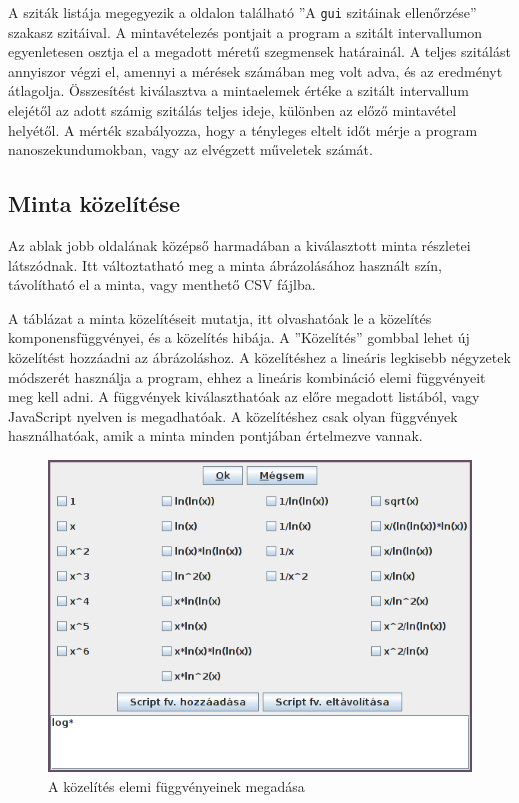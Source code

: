 A sziták listája megegyezik a \pageref{sec:szitak-ellenorzese} oldalon található ''A \texttt{gui} szitáinak ellenőrzése'' szakasz szitáival.
A mintavételezés pontjait a program a szitált intervallumon egyenletesen osztja el a megadott méretű szegmensek határainál.
A teljes szitálást annyiszor végzi el, amennyi a mérések számában meg volt adva, és az eredményt átlagolja.
Összesítést kiválasztva a mintaelemek értéke a szitált intervallum elejétől az adott számig szitálás teljes ideje, különben az előző mintavétel helyétől.
A mérték szabályozza, hogy a tényleges eltelt időt mérje a program nanoszekundumokban, vagy az elvégzett műveletek számát.

\subsection{Minta közelítése}

Az ablak jobb oldalának középső harmadában a kiválasztott minta részletei látszódnak.
Itt változtatható meg a minta ábrázolásához használt szín, távolítható el a minta, vagy menthető CSV fájlba.

A táblázat a minta közelítéseit mutatja, itt olvashatóak le a közelítés komponensfüggvényei, és a közelítés hibája.
A ''Közelítés'' gombbal lehet új közelítést hozzáadni az ábrázoláshoz.
A közelítéshez a lineáris legkisebb négyzetek módszerét használja a program, ehhez a lineáris kombináció elemi függvényeit meg kell adni.
A függvények kiválaszthatóak az előre megadott listából, vagy JavaScript nyelven is megadhatóak.
A közelítéshez csak olyan függvények használhatóak, amik a minta minden pontjában értelmezve vannak.

\begin{figure}[H]
\caption{A közelítés elemi függvényeinek megadása}
\centering
\includegraphics[scale=0.75]{functions}
\end{figure}

